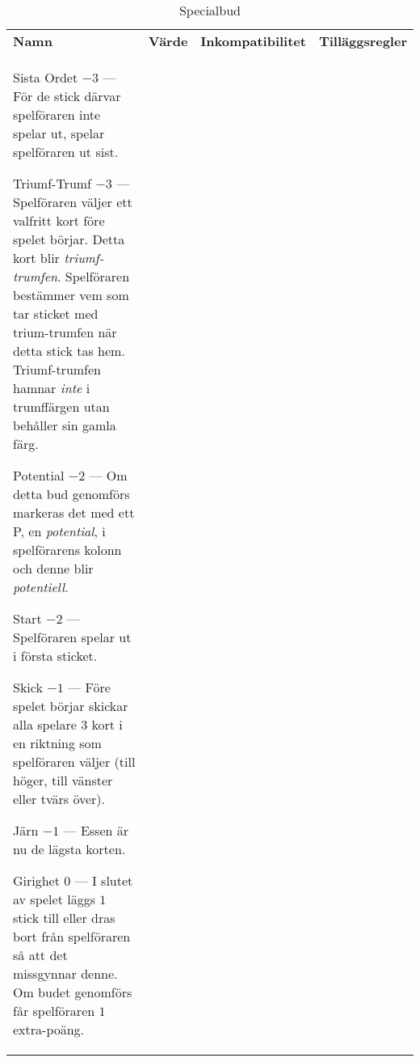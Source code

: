 %
%
%

\newcommand{\nonTrump}{\textnormal{icke-trumf-bud}}

\begin{table}
	\caption{Specialbud}\label{tab:specialBids}
	\begin{center}
		\begin{tabularx}{\textwidth}{lcp{3cm}|X}
			\textbf{Namn} &
			\textbf{Värde} &
			\textbf{Inkompatibilitet} &
			\textbf{Tilläggsregler}
			\\[-3ex]

			\specialBidItem%
			{Sista Ordet}
			{$-3$}
			{---}
			{%
				För de stick därvar spelföraren inte spelar ut, spelar spelföraren ut sist.
			}

			\specialBidItem%
			{Triumf-Trumf}
			{$-3$}
			{---}
			{%
				Spelföraren väljer ett valfritt kort före spelet börjar. Detta kort blir \emph{triumf-trumfen}. Spelföraren bestämmer vem som tar sticket med trium-trumfen när detta stick tas hem. Triumf-trumfen hamnar \emph{inte} i trumffärgen utan behåller sin gamla färg.
			}

			\specialBidItem%
			{Potential}
			{$-2$}
			{---}
			{%
				Om detta bud genomförs markeras det med ett P, en \emph{potential}, i spelförarens kolonn och denne blir \emph{potentiell}.
			}

			\specialBidItem%
			{Start}
			{$-2$}
			{---}
			{%
				Spelföraren spelar ut i första sticket.
			}

			\specialBidItem%
			{Skick}
			{$-1$}
			{---}
			{%
				Före spelet börjar skickar alla spelare $3$ kort i en riktning som spelföraren väljer (till höger, till vänster eller tvärs över).
			}

			\specialBidItem%
			{Järn}
			{$-1$}
			{---}
			{%
				Essen är nu de lägsta korten.
			}

			\specialBidItem%
			{Girighet}
			{$0$}
			{---}
			{%
				I slutet av spelet läggs $1$ stick till eller dras bort från spelföraren så att det missgynnar denne. Om budet genomförs får spelföraren $1$ extra-poäng.
			}


\end{tabularx}
\end{center}
\end{table}
